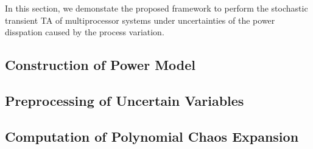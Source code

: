 In this section, we demonstate the proposed framework to perform the stochastic transient TA of multiprocessor systems under uncertainties of the power disspation caused by the process variation.

\subsection{Construction of Power Model} 


\subsection{Preprocessing of Uncertain Variables} 


\subsection{Computation of Polynomial Chaos Expansion} 

